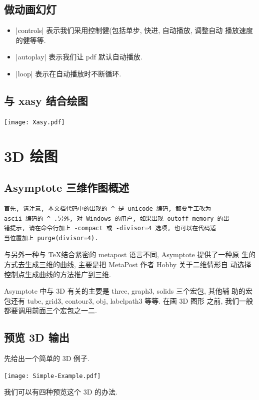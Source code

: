 \documentclass{ctexbook}
\begin{document}
\section{做动画幻灯}


\begin{itemize}
\item |controls| 表示我们采用控制健(包括单步, 快进, 自动播放, 调整自动
  播放速度的健等等.
\item |autoplay| 表示我们让 pdf 默认自动播放.
\item |loop| 表示在自动播放时不断循环.
\end{itemize}

\section{与 xasy 结合绘图}
\begin{center}\texttt{[image: Xasy.pdf]}\end{center}%




\chapter{3D 绘图}

\section{Asymptote 三维作图概述 }

\begin{verbatim}
首先, 请注意, 本文档代码中的出现的 ^ 是 unicode 编码, 都要手工改为
ascii 编码的 ^ .另外, 对 Windows 的用户, 如果出现 outoff memory 的出
错提示, 请在命令行加上 -compact 或 -divisor=4 选项, 也可以在代码适
当位置加上 purge(divisor=4).
\end{verbatim}

与另外一种与 \TeX 结合紧密的 metapost 语言不同, Asymptote 提供了一种原
生的方式去生成三维的曲线, 主要是把 MetaPost 作者 Hobby 关于二维情形自
动选择控制点生成曲线的方法推广到三维.

Asymptote 中与 3D 有关的主要是 three, graph3, solids  三个宏包, 其他辅
助的宏包还有 tube, grid3, contour3, obj, labelpath3 等等. 在画 3D 图形
之前, 我们一般都要调用前面三个宏包之一二.

\section{预览 3D 输出}
先给出一个简单的 3D 例子.
\begin{center}\texttt{[image: Simple-Example.pdf]}\end{center}%

我们可以有四种预览这个 3D 的办法.
\end{document}
